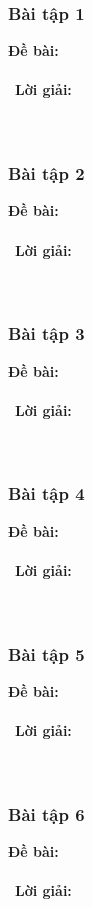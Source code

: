 \documentclass[a4paper]{article}
\begin{document}
\subsubsection{Bài tập 1}
\textbf{Đề bài:} 
\\\ \\\
\textbf{Lời giải:} \\\ \\\
\clearpage
\subsubsection{Bài tập 2}
\textbf{Đề bài:} 
\\\ \\\
\textbf{Lời giải:} \\\ \\\
\clearpage
\subsubsection{Bài tập 3}
\textbf{Đề bài:} 
\\\ \\\
\textbf{Lời giải:} \\\ \\\
\clearpage
\subsubsection{Bài tập 4}
\textbf{Đề bài:} 
\\\ \\\
\textbf{Lời giải:} \\\ \\\
\clearpage
\subsubsection{Bài tập 5}
\textbf{Đề bài:} 
\\\ \\\
\textbf{Lời giải:} \\\ \\\
\clearpage
\subsubsection{Bài tập 6}
\textbf{Đề bài:} 
\\\ \\\
\textbf{Lời giải:} \\\ \\\
\clearpage
\end{document}
